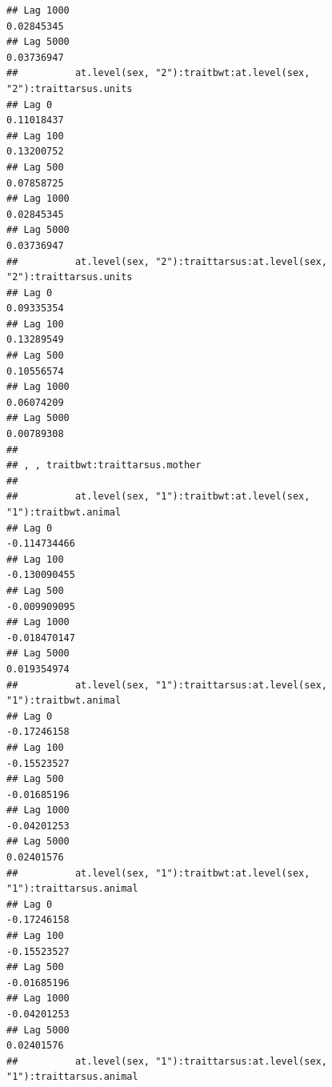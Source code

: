 \documentclass[
  12pt,
]{book}
\begin{document}
\begin{verbatim}
## Lag 1000                                                       0.02845345
## Lag 5000                                                       0.03736947
##          at.level(sex, "2"):traitbwt:at.level(sex, "2"):traittarsus.units
## Lag 0                                                          0.11018437
## Lag 100                                                        0.13200752
## Lag 500                                                        0.07858725
## Lag 1000                                                       0.02845345
## Lag 5000                                                       0.03736947
##          at.level(sex, "2"):traittarsus:at.level(sex, "2"):traittarsus.units
## Lag 0                                                             0.09335354
## Lag 100                                                           0.13289549
## Lag 500                                                           0.10556574
## Lag 1000                                                          0.06074209
## Lag 5000                                                          0.00789308
## 
## , , traitbwt:traittarsus.mother
## 
##          at.level(sex, "1"):traitbwt:at.level(sex, "1"):traitbwt.animal
## Lag 0                                                      -0.114734466
## Lag 100                                                    -0.130090455
## Lag 500                                                    -0.009909095
## Lag 1000                                                   -0.018470147
## Lag 5000                                                    0.019354974
##          at.level(sex, "1"):traittarsus:at.level(sex, "1"):traitbwt.animal
## Lag 0                                                          -0.17246158
## Lag 100                                                        -0.15523527
## Lag 500                                                        -0.01685196
## Lag 1000                                                       -0.04201253
## Lag 5000                                                        0.02401576
##          at.level(sex, "1"):traitbwt:at.level(sex, "1"):traittarsus.animal
## Lag 0                                                          -0.17246158
## Lag 100                                                        -0.15523527
## Lag 500                                                        -0.01685196
## Lag 1000                                                       -0.04201253
## Lag 5000                                                        0.02401576
##          at.level(sex, "1"):traittarsus:at.level(sex, "1"):traittarsus.animal

\end{verbatim}
\end{document}
